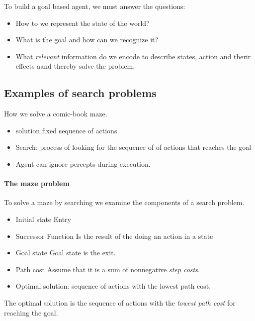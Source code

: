 \documentclass{article}
\begin{document}
To build a goal based agent, we must answer the questions\cite[p.
15]{presentation:solving_problems_by_searching}:
\begin{itemize}
  \item How to we represent the state of the world?
  \item What is the goal and how can we recognize it?
  \item What \textit{relevant} information do we encode to describe states,
    action and therir effects aand thereby solve the problem.
\end{itemize}

\subsection{Examples of search problems}

How we solve a comic-book maze.
\begin{itemize}[noitemsep]
  \item solution fixed sequence of actions 
  \item Search: process  of looking for the sequence of of actions that reaches
    the goal
  \item Agent can ignore percepts during execution.
\end{itemize}

\paragraph{The maze problem}

To solve a maze by searching we examine the components of a search problem.
\cite[p. 8]{presentation:solving_problems_by_searching}

\begin{itemize}[noitemsep]
  \item Initial state 
    \subitem Entry 
  \item Successor Function
    \subitem Is the result of the doing an action in a state
  \item Goal state 
    \subitem Goal state is the exit.
  \item Path cost
    \subitem Assume that it is a sum of nonnegative \textit{step costs}.
  \item Optimal solution: sequence of actions with the lowest path cost.
\end{itemize}

The optimal solution is the sequence of actions with the \textit{lowest path
cost} for reaching the goal.
\end{document}
